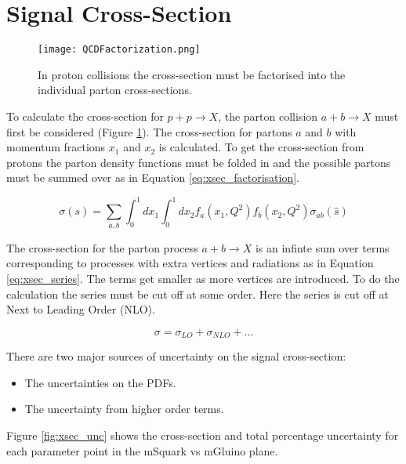 \section{Signal Cross-Section}
\label{sec:xsec}

\begin{figure}
\begin{center}
\texttt{[image: QCDFactorization.png]}
\end{center}
\caption{In proton collisions the cross-section must be factorised into the 
individual parton cross-sections.}
\label{fig:QCDFactorization}
\end{figure}

To calculate the cross-section for $p + p \rightarrow X$, the parton collision 
$a + b \rightarrow X$ must first be considered (Figure 
\ref{fig:QCDFactorization}). The cross-section for partons $a$ and $b$ with 
momentum fractions $x_{1}$ and $x_{2}$ is calculated. To get the cross-section 
from protons the parton density functions must be folded in and the possible 
partons must be summed over as in Equation \ref{eq:xsec_factorisation}.

\begin{equation}
\sigma(s) =
\displaystyle\sum\limits_{a,b}\int_{0}^{1}dx_{1}\int_{0}^{1}dx_{2}f_{a}(x_{1},Q^{2})f_{b}(x_{2},Q^{2})\sigma_{ab}(\hat{s})
\label{eq:xsec_factorisation}
\end{equation}

The cross-section for the parton process $a + b \rightarrow X$ is an infinte sum
over terms corresponding to processes with extra vertices and radiations as in
Equation \ref{eq:xsec_series}. The terms get smaller as more vertices are 
introduced. To do the calculation the series must be cut off at some order. Here
the series is cut off at Next to Leading Order (NLO).

\begin{equation}
\sigma = \sigma_{LO} + \sigma_{NLO} + ...
\label{eq:xsec_series}
\end{equation}

There are two major sources of uncertainty on the signal cross-section:

\begin{itemize} 
\item The uncertainties on the PDFs.
\item The uncertainty from higher order terms.
\end{itemize}

Figure \ref{fig:xsec_unc} shows the cross-section and total percentage 
uncertainty for each parameter point in the mSquark vs mGluino plane.

